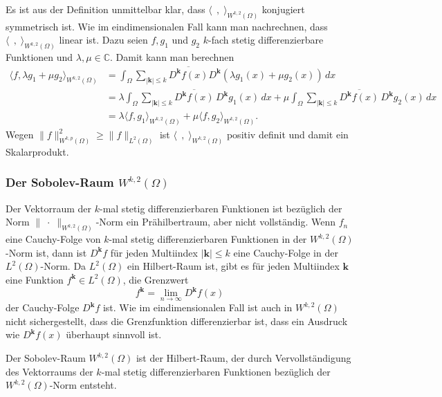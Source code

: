 Es ist aus der Definition unmittelbar klar, dass
$\langle\;\,,\;\rangle_{W^{k,2}(\Omega)}$
konjugiert symmetrisch ist.
Wie im eindimensionalen Fall kann man nachrechnen, dass 
$\langle\;\,,\;\rangle_{W^{k,2}(\Omega)}$
linear ist.
Dazu seien $f,g_1$ und $g_2$ $k$-fach stetig differenzierbare Funktionen
und $\lambda,\mu\in\mathbb{C}$.
Damit kann man berechnen
\begin{align*}
\langle f,\lambda g_1+\mu g_2\rangle_{W^{k,2}(\Omega)}
&=
\int_{\Omega}
\sum_{|\bm{k}|\le k}
\overline{D^{\bm{k}}f(x)}
D^{\bm{k}}(\lambda g_1(x)+\mu g_2(x))
\,dx
\\
&=
\lambda
\int_{\Omega}
\sum_{|\bm{k}|\le k}
\overline{D^{\bm{k}}f(x)}
\,D^{\bm{k}}g_1(x)
\,dx
+
\mu
\int_{\Omega}
\sum_{|\bm{k}|\le k}
\overline{D^{\bm{k}}f(x)}
\,D^{\bm{k}}g_2(x)
\,dx
\\
&=
\lambda
\langle f,g_1\rangle_{W^{k,2}(\Omega)}
+
\mu
\langle f,g_2\rangle_{W^{k,2}(\Omega)}.
\end{align*}
Wegen $\|f\|_{W^{k,p}(\Omega)}^2 \ge \|f\|_{L^2(\Omega)}$ ist 
$\langle\;\,,\;\rangle_{W^{k,2}(\Omega)}$ positiv definit und damit
ein Skalarprodukt.

%
%
\subsubsection{Der Sobolev-Raum $W^{k,2}(\Omega)$}
Der Vektorraum der $k$-mal stetig differenzierbaren Funktionen 
ist bezüglich der Norm $\|\;\cdot\;\|_{W^{k,2}(\Omega)}$-Norm
ein Prähilbertraum, aber nicht vollständig.
Wenn $f_n$ eine Cauchy-Folge von $k$-mal stetig differenzierbaren
Funktionen in der $W^{k,2}(\Omega)$-Norm ist, dann ist $D^{\bm{k}}f$
für jeden Multiindex $|\bm{k}|\le k$ eine Cauchy-Folge in der
$L^2(\Omega)$-Norm.
Da $L^2(\Omega)$ ein Hilbert-Raum ist, gibt es für jeden Multiindex $\bm{k}$
eine Funktion $f^{\bm{k}}\in L^2(\Omega)$, die Grenzwert
\[
f^{\bm{k}} = \lim_{n\to\infty} D^{\bm{k}}f(x)
\]
der Cauchy-Folge $D^{\bm{k}}f$ ist.
Wie im eindimensionalen Fall ist auch in $W^{k,2}(\Omega)$ nicht
sichergestellt, dass die Grenzfunktion differenzierbar ist, dass ein
Ausdruck wie $D^{\bm{k}}f(x)$ überhaupt sinnvoll ist.

\begin{definition}
Der Sobolev-Raum $W^{k,2}(\Omega)$ ist der Hilbert-Raum, der durch
Vervollständigung des Vektorraums der $k$-mal stetig differenzierbaren
Funktionen bezüglich der $W^{k,2}(\Omega)$-Norm entsteht.
\end{definition}

